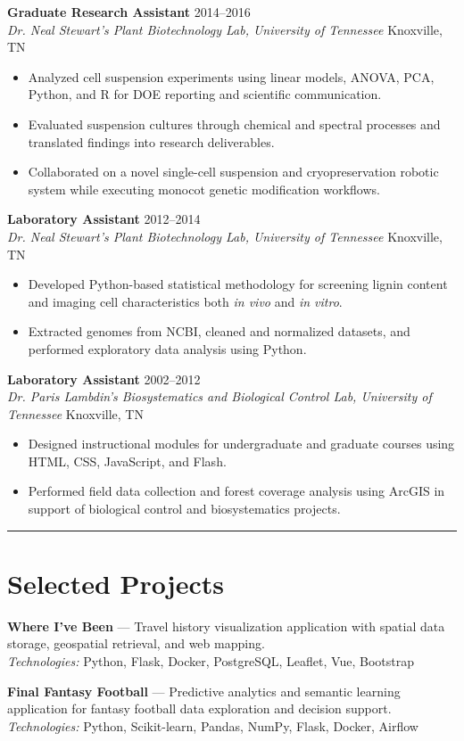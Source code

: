 \documentclass[10pt]{article}
\newcommand{\sectionline}{\vspace{0.25em}\noindent\rule{\textwidth}{0.4pt}\vspace{-0.45em}}
\newcommand{\cvsection}[2]{\sectionline\section*{{\mdseries #1}\hspace{0.35em}#2}\vspace{-0.45em}}
\newcommand{\role}[4]{%
    \textbf{#1} \hfill #4\\
    \textit{#2} \hfill #3
}
\newcommand{\project}[3]{%
    \textbf{#1} --- #2\\
    \textit{Technologies:} #3
}
\begin{document}
\role{Graduate Research Assistant}{Dr. Neal Stewart's Plant Biotechnology Lab, University of Tennessee}{Knoxville, TN}{2014--2016}
\begin{itemize}
    \item Analyzed cell suspension experiments using linear models, ANOVA, PCA, Python, and R for DOE reporting and scientific communication.
    \item Evaluated suspension cultures through chemical and spectral processes and translated findings into research deliverables.
    \item Collaborated on a novel single-cell suspension and cryopreservation robotic system while executing monocot genetic modification workflows.
\end{itemize}

\role{Laboratory Assistant}{Dr. Neal Stewart's Plant Biotechnology Lab, University of Tennessee}{Knoxville, TN}{2012--2014}
\begin{itemize}
    \item Developed Python-based statistical methodology for screening lignin content and imaging cell characteristics both \textit{in vivo} and \textit{in vitro}.
    \item Extracted genomes from NCBI, cleaned and normalized datasets, and performed exploratory data analysis using Python.
\end{itemize}

\role{Laboratory Assistant}{Dr. Paris Lambdin's Biosystematics and Biological Control Lab, University of Tennessee}{Knoxville, TN}{2002--2012}
\begin{itemize}
    \item Designed instructional modules for undergraduate and graduate courses using HTML, CSS, JavaScript, and Flash.
    \item Performed field data collection and forest coverage analysis using ArcGIS in support of biological control and biosystematics projects.
\end{itemize}

\cvsection{\faPuzzlePiece}{Selected Projects}
\project{Where I've Been}{Travel history visualization application with spatial data storage, geospatial retrieval, and web mapping.}{Python, Flask, Docker, PostgreSQL, Leaflet, Vue, Bootstrap}

\project{Final Fantasy Football}{Predictive analytics and semantic learning application for fantasy football data exploration and decision support.}{Python, Scikit-learn, Pandas, NumPy, Flask, Docker, Airflow}
\end{document}
